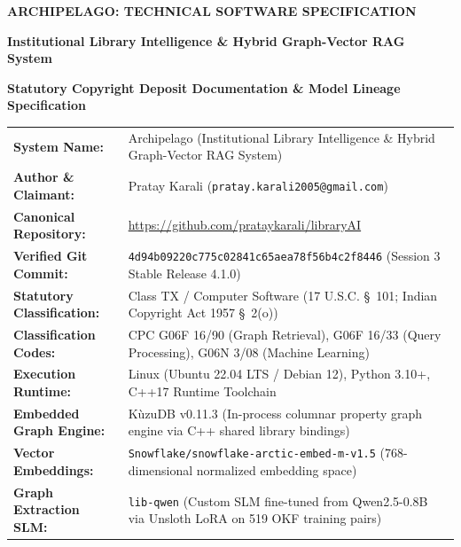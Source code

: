 \documentclass[10pt,a4paper]{article}
\begin{document}
\begin{center}
    {\fontsize{16pt}{22pt}\selectfont\bfseries ARCHIPELAGO: TECHNICAL SOFTWARE SPECIFICATION\par}
    \vspace{4pt}
    {\fontsize{12pt}{16pt}\selectfont\bfseries Institutional Library Intelligence \& Hybrid Graph-Vector RAG System\par}
    \vspace{3pt}
    {\normalsize\textbf{Statutory Copyright Deposit Documentation \& Model Lineage Specification}\par}
\end{center}

\vspace{-0.2cm}
\begin{tcolorbox}[colback=blue!3!white,colframe=blue!40!black,title=\textbf{System Identification \& Intellectual Property Provenance},fonttitle=\small\bfseries]
\footnotesize
\begin{tabularx}{\textwidth}{lX}
\textbf{System Name:} & Archipelago (Institutional Library Intelligence \& Hybrid Graph-Vector RAG System) \\
\textbf{Author \& Claimant:} & Pratay Karali (\texttt{pratay.karali2005@gmail.com}) \\
\textbf{Canonical Repository:} & \url{https://github.com/prataykarali/libraryAI} \\
\textbf{Verified Git Commit:} & \texttt{4d94b09220c775c02841c65aea78f56b4c2f8446} (Session 3 Stable Release 4.1.0) \\
\textbf{Statutory Classification:} & Class TX / Computer Software (17 U.S.C. \S\ 101; Indian Copyright Act 1957 \S\ 2(o)) \\
\textbf{Classification Codes:} & CPC G06F 16/90 (Graph Retrieval), G06F 16/33 (Query Processing), G06N 3/08 (Machine Learning) \\
\textbf{Execution Runtime:} & Linux (Ubuntu 22.04 LTS / Debian 12), Python 3.10+, C++17 Runtime Toolchain \\
\textbf{Embedded Graph Engine:} & K\`uzuDB v0.11.3 (In-process columnar property graph engine via C++ shared library bindings) \\
\textbf{Vector Embeddings:} & \texttt{Snowflake/snowflake-arctic-embed-m-v1.5} (768-dimensional normalized embedding space) \\
\textbf{Graph Extraction SLM:} & \texttt{lib-qwen} (Custom SLM fine-tuned from Qwen2.5-0.8B via Unsloth LoRA on 519 OKF training pairs) \\
\end{tabularx}
\end{tcolorbox}
\end{document}
